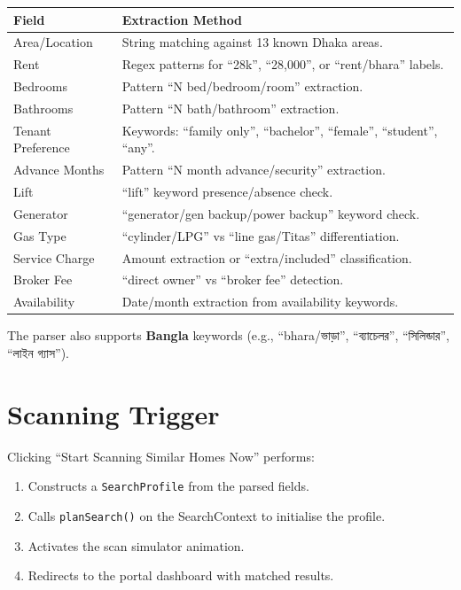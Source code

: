 \documentclass[12pt, a4paper, oneside]{report}
\newcommand{\typename}[1]{\texttt{\small\color{codeblue}#1}}
\begin{document}
\begin{longtable}{p{4cm} p{9cm}}
\toprule
\textbf{Field} & \textbf{Extraction Method} \\
\midrule
\endhead
Area/Location & String matching against 13 known Dhaka areas. \\
\midrule
Rent & Regex patterns for ``28k'', ``28,000'', or ``rent/bhara'' labels. \\
\midrule
Bedrooms & Pattern ``N bed/bedroom/room'' extraction. \\
\midrule
Bathrooms & Pattern ``N bath/bathroom'' extraction. \\
\midrule
Tenant Preference & Keywords: ``family only'', ``bachelor'', ``female'', ``student'', ``any''. \\
\midrule
Advance Months & Pattern ``N month advance/security'' extraction. \\
\midrule
Lift & ``lift'' keyword presence/absence check. \\
\midrule
Generator & ``generator/gen backup/power backup'' keyword check. \\
\midrule
Gas Type & ``cylinder/LPG'' vs ``line gas/Titas'' differentiation. \\
\midrule
Service Charge & Amount extraction or ``extra/included'' classification. \\
\midrule
Broker Fee & ``direct owner'' vs ``broker fee'' detection. \\
\midrule
Availability & Date/month extraction from availability keywords. \\
\bottomrule
\end{longtable}

The parser also supports \textbf{Bangla} keywords (e.g., ``bhara/ভাড়া'', ``ব্যাচেলর'', ``সিলিন্ডার'', ``লাইন গ্যাস'').

\section{Scanning Trigger}

Clicking ``Start Scanning Similar Homes Now'' performs:

\begin{enumerate}[leftmargin=2em]
  \item Constructs a \typename{SearchProfile} from the parsed fields.
  \item Calls \texttt{planSearch()} on the SearchContext to initialise the profile.
  \item Activates the scan simulator animation.
  \item Redirects to the portal dashboard with matched results.
\end{enumerate}
\end{document}
